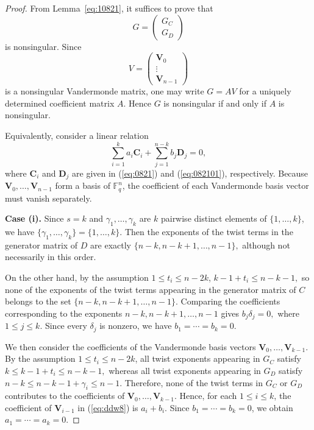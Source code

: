 \documentclass[10pt,a4paper]{amsart}
\newcommand{\F}{{\mathbb{F}}}
\begin{document}
\begin{proof}
From Lemma~\ref{eq:10821}, it suffices to prove that
\[
G=
\begin{pmatrix}
G_C\\
G_D
\end{pmatrix}
\]
is nonsingular. Since
\[
V=
\begin{pmatrix}
\mathbf{V}_0\\
\vdots\\
\mathbf{V}_{n-1}
\end{pmatrix}
\]
is a nonsingular Vandermonde matrix, one may write \(G=AV\) for a uniquely determined coefficient matrix \(A\). Hence \(G\) is nonsingular if and only if \(A\) is nonsingular.

Equivalently, consider a linear relation
\begin{equation}\label{eq:ddw8}
\sum_{i=1}^{k}a_i\mathbf{C}_i
+
\sum_{j=1}^{n-k}b_j\mathbf{D}_j
=0,
\end{equation}
where \(\mathbf{C}_i\) and \(\mathbf{D}_j\) are given in
(\ref{eq:0821}) and (\ref{eq:082101}), respectively.
Because \(\mathbf{V}_0,\ldots,\mathbf{V}_{n-1}\) form a basis of \(\F_q^n\), the coefficient of each Vandermonde basis vector must vanish separately.

\medskip
\noindent\textbf{Case (i).}
Since \(s=k\) and \(\gamma_1,\ldots,\gamma_k\) are \(k\) pairwise distinct elements of \(\{1,\ldots,k\}\), we have
\(
\{\gamma_1,\ldots,\gamma_k\}=\{1,\ldots,k\}.
\)
Then the exponents of the twist terms in the generator matrix of \(D\) are exactly
\(
\{n-k,n-k+1,\ldots,n-1\},
\)
although not necessarily in this order.

On the other hand, by the assumption \(1\le t_i\le n-2k\),
\(
k-1+t_i\le n-k-1,
\)
so none of the exponents of the twist terms appearing in the generator matrix of \(C\) belongs to the set \(\{n-k,n-k+1,\ldots,n-1\}\). Comparing the coefficients corresponding to the exponents \(n-k,n-k+1,\ldots,n-1\) gives
$
b_j\delta_j=0,
$
where \(1\le j\le k\).
Since every \(\delta_j\) is nonzero, we have
\(
b_1=\cdots=b_k=0.
\)

We then consider the coefficients of the Vandermonde basis vectors
\(
\mathbf{V}_0,\ldots,\mathbf{V}_{k-1}.
\)
By the assumption \(1\le t_i\le n-2k\), all twist exponents appearing in \(G_C\) satisfy
\(
k\le k-1+t_i\le n-k-1,
\)
whereas all twist exponents appearing in \(G_D\) satisfy
\(
n-k\le n-k-1+\gamma_i\le n-1.
\)
Therefore, none of the twist terms in \(G_C\) or \(G_D\) contributes to the coefficients of
\(
\mathbf{V}_0,\ldots,\mathbf{V}_{k-1}.
\)
Hence, for each \(1\le i\le k\), the coefficient of \(\mathbf{V}_{i-1}\) in (\ref{eq:ddw8}) is
\(
a_i+b_i.
\)
Since \(b_1=\cdots=b_k=0\), we obtain
\(
a_1=\cdots=a_k=0.
\)


\end{proof}
\end{document}
